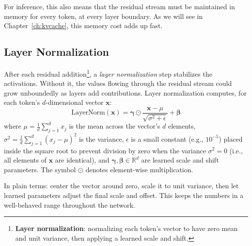 For inference, this also means that the residual stream must be maintained in memory for every token, at every layer boundary. As we will see in Chapter~\ref{ch:kvcache}, this memory cost adds up fast.

\subsection{Layer Normalization}
\label{sec:layernorm}

%
After each residual addition\footnote{\textbf{Layer normalization}: normalizing each token's vector to have zero mean and unit variance, then applying a learned scale and shift.}, a \emph{layer normalization} step stabilizes the activations. Without it, the values flowing through the residual stream could grow unboundedly as layers add contributions. Layer normalization computes, for each token's $d$-dimensional vector $\mathbf{x}$:
\begin{equation}
\label{eq:layernorm}
\text{LayerNorm}(\mathbf{x}) = \boldsymbol{\gamma} \odot \frac{\mathbf{x} - \mu}{\sqrt{\sigma^2 + \epsilon}} + \boldsymbol{\beta}
\end{equation}
where $\mu = \frac{1}{d}\sum_{j=1}^{d} x_j$ is the mean across the vector's $d$ elements, $\sigma^2 = \frac{1}{d}\sum_{j=1}^{d}(x_j - \mu)^2$ is the variance, $\epsilon$ is a small constant (e.g., $10^{-5}$) placed inside the square root to prevent division by zero when the variance $\sigma^2 = 0$ (i.e., all elements of $\mathbf{x}$ are identical), and $\boldsymbol{\gamma}, \boldsymbol{\beta} \in \mathbb{R}^d$ are learned scale and shift parameters. The symbol $\odot$ denotes element-wise multiplication.

In plain terms: center the vector around zero, scale it to unit variance, then let learned parameters adjust the final scale and offset. This keeps the numbers in a well-behaved range throughout the network.


